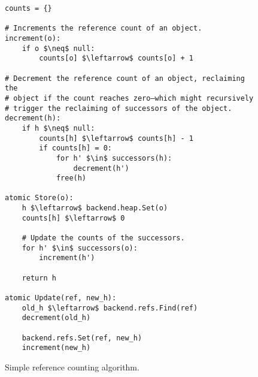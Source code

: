 \begin{figure}[!ht]
  \caption{Simple reference counting algorithm.}
  \label{alg:ref-count}

  \vspace{-.5em}
  \centering
  \begin{lstlisting}
counts = {}

# Increments the reference count of an object.
increment(o):
    if o $\neq$ null:
        counts[o] $\leftarrow$ counts[o] + 1

# Decrement the reference count of an object, reclaiming the
# object if the count reaches zero–which might recursively
# trigger the reclaiming of successors of the object.
decrement(h):
    if h $\neq$ null:
        counts[h] $\leftarrow$ counts[h] - 1
        if counts[h] = 0:
            for h' $\in$ successors(h):
                decrement(h')
            free(h)

atomic Store(o):
    h $\leftarrow$ backend.heap.Set(o)
    counts[h] $\leftarrow$ 0

    # Update the counts of the successors.
    for h' $\in$ successors(o):
        increment(h')

    return h

atomic Update(ref, new_h):
    old_h $\leftarrow$ backend.refs.Find(ref)
    decrement(old_h)

    backend.refs.Set(ref, new_h)
    increment(new_h)
\end{lstlisting}
\end{figure}
